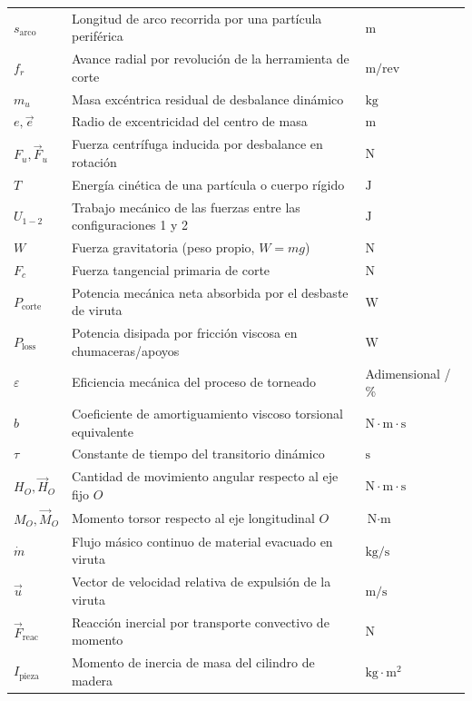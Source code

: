 \documentclass[12pt,a4paper]{article}
\begin{document}
\begin{center}
\begin{longtable}{p{1.8cm} p{10.2cm} >{\centering\arraybackslash}p{2.6cm}}
    $s_{\text{arco}}$ & Longitud de arco recorrida por una partícula periférica & $\text{m}$ \\
    $f_r$ & Avance radial por revolución de la herramienta de corte & $\text{m/rev}$ \\
    $m_u$ & Masa excéntrica residual de desbalance dinámico & $\text{kg}$ \\
    $e, \vec{e}$ & Radio de excentricidad del centro de masa & $\text{m}$ \\
    $F_u, \vec{F}_u$ & Fuerza centrífuga inducida por desbalance en rotación & $\text{N}$ \\
    $T$ & Energía cinética de una partícula o cuerpo rígido & $\text{J}$ \\
    $U_{1-2}$ & Trabajo mecánico de las fuerzas entre las configuraciones 1 y 2 & $\text{J}$ \\
    $W$ & Fuerza gravitatoria (peso propio, $W = mg$) & $\text{N}$ \\
    $F_c$ & Fuerza tangencial primaria de corte & $\text{N}$ \\
    $P_{\text{corte}}$ & Potencia mecánica neta absorbida por el desbaste de viruta & $\text{W}$ \\
    $P_{\text{loss}}$ & Potencia disipada por fricción viscosa en chumaceras/apoyos & $\text{W}$ \\
    $\varepsilon$ & Eficiencia mecánica del proceso de torneado & Adimensional / \% \\
    $b$ & Coeficiente de amortiguamiento viscoso torsional equivalente & $\text{N}\cdot\text{m}\cdot\text{s}$ \\
    $\tau$ & Constante de tiempo del transitorio dinámico & $\text{s}$ \\
    $H_O, \vec{H}_O$ & Cantidad de movimiento angular respecto al eje fijo $O$ & $\text{N}\cdot\text{m}\cdot\text{s}$ \\
    $M_O, \vec{M}_O$ & Momento torsor respecto al eje longitudinal $O$ & $\text{N}\cdot\text{m}$ \\
    $\dot{m}$ & Flujo másico continuo de material evacuado en viruta & $\text{kg/s}$ \\
    $\vec{u}$ & Vector de velocidad relativa de expulsión de la viruta & $\text{m/s}$ \\
    $\vec{F}_{\text{reac}}$ & Reacción inercial por transporte convectivo de momento & $\text{N}$ \\
    $I_{\text{pieza}}$ & Momento de inercia de masa del cilindro de madera & $\text{kg}\cdot\text{m}^2$ \\

\end{longtable}
\end{center}
\end{document}
